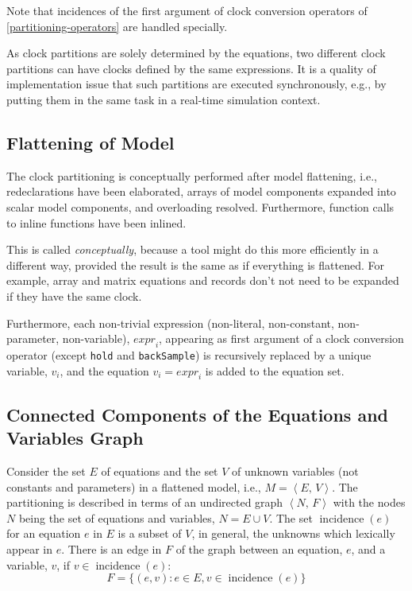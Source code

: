 Note that incidences of the first argument of clock conversion operators of \cref{partitioning-operators} are handled specially.

\begin{nonnormative}
As clock partitions are solely determined by the equations, two different clock partitions can have clocks defined by the same expressions.
It is a quality of implementation issue that such partitions are executed synchronously, e.g., by putting them in the same task in a real-time simulation context.
\end{nonnormative}

\subsection{Flattening of Model}\label{flattening-of-model}

The clock partitioning is conceptually performed after model flattening, i.e., redeclarations have been elaborated, arrays of model components expanded into scalar model components, and overloading resolved.
Furthermore, function calls to inline functions have been inlined.

\begin{nonnormative}
This is called \emph{conceptually}, because a tool might do this more efficiently in a different way, provided the result is the same as if everything is flattened.
For example, array and matrix equations and records don't not need to be expanded if they have the same clock.
\end{nonnormative}

Furthermore, each non-trivial expression (non-literal, non-constant, non-parameter, non-variable), $\mathit{expr}_{i}$, appearing as first argument of a clock conversion operator (except \lstinline!hold! and \lstinline!backSample!) is recursively replaced by a unique variable, $v_{i}$, and the equation $v_{i} = \mathit{expr}_{i}$ is added to the equation set.

\subsection{Connected Components of the Equations and Variables Graph}\label{connected-components-of-the-equations-and-variables-graph}

Consider the set $E$ of equations and the set $V$ of unknown variables (not constants and parameters) in a flattened model, i.e., $M = \left\langle E,\, V \right\rangle$.
The partitioning is described in terms of an undirected graph $\left\langle N,\, F \right\rangle$ with the nodes $N$ being the set of equations and variables, $N = E \cup V$.
The set $\operatorname{incidence}(e)$ for an equation $e$ in $E$ is a subset of $V$, in general, the unknowns which lexically appear in $e$.
There is an edge in $F$ of the graph between an equation, $e$, and a variable, $v$, if $v \in \operatorname{incidence}(e)$:
\begin{equation*}
F = \{(e, v) : e \in E, v \in \operatorname{incidence}(e)\}
\end{equation*}

